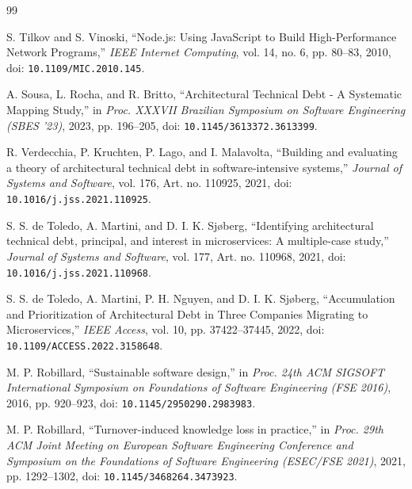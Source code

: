 \documentclass[12pt,a4paper,oneside]{report}
\begin{document}
\begin{thebibliography}{99}
\setlength{\itemsep}{2pt}
\setlength{\parskip}{0pt}

S. Tilkov and S. Vinoski, ``Node.js: Using JavaScript to Build High-Performance Network Programs,'' \textit{IEEE Internet Computing}, vol. 14, no. 6, pp. 80--83, 2010, doi: \nolinkurl{10.1109/MIC.2010.145}.

A. Sousa, L. Rocha, and R. Britto, ``Architectural Technical Debt - A Systematic Mapping Study,'' in \textit{Proc. XXXVII Brazilian Symposium on Software Engineering (SBES '23)}, 2023, pp. 196--205, doi: \nolinkurl{10.1145/3613372.3613399}.

R. Verdecchia, P. Kruchten, P. Lago, and I. Malavolta, ``Building and evaluating a theory of architectural technical debt in software-intensive systems,'' \textit{Journal of Systems and Software}, vol. 176, Art. no. 110925, 2021, doi: \nolinkurl{10.1016/j.jss.2021.110925}.

S. S. de Toledo, A. Martini, and D. I. K. Sjøberg, ``Identifying architectural technical debt, principal, and interest in microservices: A multiple-case study,'' \textit{Journal of Systems and Software}, vol. 177, Art. no. 110968, 2021, doi: \nolinkurl{10.1016/j.jss.2021.110968}.

S. S. de Toledo, A. Martini, P. H. Nguyen, and D. I. K. Sjøberg, ``Accumulation and Prioritization of Architectural Debt in Three Companies Migrating to Microservices,'' \textit{IEEE Access}, vol. 10, pp. 37422--37445, 2022, doi: \nolinkurl{10.1109/ACCESS.2022.3158648}.

M. P. Robillard, ``Sustainable software design,'' in \textit{Proc. 24th ACM SIGSOFT International Symposium on Foundations of Software Engineering (FSE 2016)}, 2016, pp. 920--923, doi: \nolinkurl{10.1145/2950290.2983983}.

M. P. Robillard, ``Turnover-induced knowledge loss in practice,'' in \textit{Proc. 29th ACM Joint Meeting on European Software Engineering Conference and Symposium on the Foundations of Software Engineering (ESEC/FSE 2021)}, 2021, pp. 1292--1302, doi: \nolinkurl{10.1145/3468264.3473923}.


\end{thebibliography}
\end{document}
